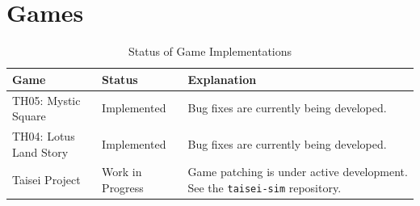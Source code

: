 \chapter{Games}
\label{ch:games}

\begin{table}[htbp]
  \centering
  \caption{Status of Game Implementations}
  \label{tab:table1}

  \begin{tabularx}{\textwidth}{
    >{\RaggedRight\arraybackslash}p{} |
    >{\RaggedRight\arraybackslash}p{} |
    >{\RaggedRight\arraybackslash}X
  }
    \textbf{Game} &
    \textbf{Status} &
    \textbf{Explanation} \\
    \hline

    TH05: Mystic Square &
    Implemented &
    Bug fixes are currently being developed. \\

    TH04: Lotus Land Story &
    Implemented &
    Bug fixes are currently being developed. \\

    Taisei Project &
    Work in Progress &
    Game patching is under active development. See the
    \texttt{taisei-sim} repository. \\
  \end{tabularx}
\end{table}
